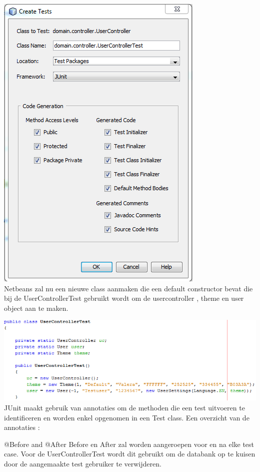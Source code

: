 \documentclass[pdftex,a4paper,12pt,twoside]{report}
\begin{document}
\includegraphics{images/netbeansjunit2.png}\\

Netbeans zal nu een nieuwe class aanmaken die een default constructor bevat die bij de UserControllerTest gebruikt wordt om de usercontroller , theme en user object aan te maken.

\includegraphics{images/junit1.png}\\

JUnit maakt gebruik van annotaties om de methoden die een test uitvoeren te identificeren en worden enkel opgenomen in een Test class. 
Een overzicht van de annotaties :

@Before and @After
Before en After zal worden aangeroepen voor en na elke test case.
Voor de UserControllerTest wordt dit gebruikt om de databank op te kuisen door de aangemaakte test gebruiker te verwijderen.
\end{document}
